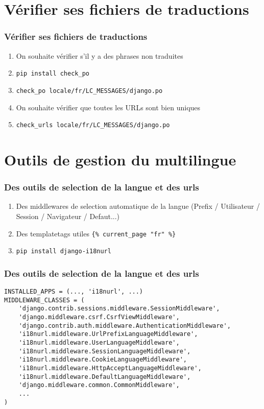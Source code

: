 \documentclass{beamer}
\begin{document}
\section{Vérifier ses fichiers de traductions}
\begin{frame}
  \frametitle{Vérifier ses fichiers de traductions}

  \begin{enumerate}
    \item On souhaite vérifier s'il y a des phrases non traduites
    \pause \item \texttt{pip install check\_po}
    \pause \item \texttt{check\_po locale/fr/LC\_MESSAGES/django.po}
    \pause \item On souhaite vérifier que toutes les URLs sont bien uniques
    \pause \item \texttt{check\_urls locale/fr/LC\_MESSAGES/django.po}
  \end{enumerate}
\end{frame}

\section{Outils de gestion du multilingue}

\begin{frame}
  \frametitle{Des outils de selection de la langue et des urls}
  \begin{enumerate}
    \item Des middlewares de selection automatique de la langue (Prefix / Utilisateur / Session / Navigateur / Defaut...)
    \pause \item Des templatetags utiles \pause \texttt{\{\% current\_page "fr" \%\}}
    \pause \item \texttt{pip install django-i18nurl}
  \end{enumerate}

\end{frame}

\begin{frame}[fragile]
  \frametitle{Des outils de selection de la langue et des urls}

  \begin{lstlisting}
INSTALLED_APPS = (..., 'i18nurl', ...)
MIDDLEWARE_CLASSES = (
    'django.contrib.sessions.middleware.SessionMiddleware',
    'django.middleware.csrf.CsrfViewMiddleware',
    'django.contrib.auth.middleware.AuthenticationMiddleware',
    'i18nurl.middleware.UrlPrefixLanguageMiddleware',
    'i18nurl.middleware.UserLanguageMiddleware',
    'i18nurl.middleware.SessionLanguageMiddleware',
    'i18nurl.middleware.CookieLanguageMiddleware',
    'i18nurl.middleware.HttpAcceptLanguageMiddleware',
    'i18nurl.middleware.DefaultLanguageMiddleware',
    'django.middleware.common.CommonMiddleware',
    ...
)
  \end{lstlisting}

\end{frame}
\end{document}
